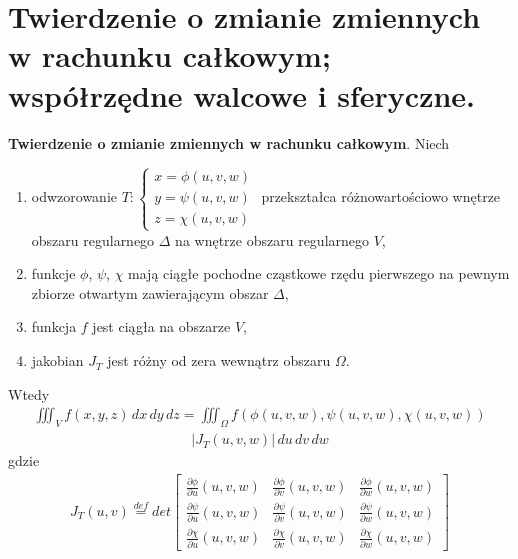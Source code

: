 \documentclass[12pt]{article}
\begin{document}
    \newpage

    \section{Twierdzenie o zmianie zmiennych w rachunku całkowym; współrzędne walcowe i sferyczne.}

    \begin{definition}
        \textbf{Twierdzenie o zmianie zmiennych w rachunku całkowym}. Niech
        \begin{enumerate}
            \item odwzorowanie $ T: \begin{cases}
                                        x = \phi(u,v,w) \\
                                        y = \psi(u,v,w) \\
                                        z = \chi(u,v,w)
            \end{cases}$ przekształca różnowartościowo wnętrze obszaru regularnego $\Delta$ na wnętrze obszaru
            regularnego $V$,
            \item funkcje $\phi$, $\psi$, $\chi$ mają ciągłe pochodne cząstkowe rzędu pierwszego na pewnym zbiorze
            otwartym zawierającym obszar $\Delta$,
            \item funkcja $f$ jest ciągła na obszarze $V$,
            \item jakobian $J_T$ jest różny od zera wewnątrz obszaru $\Omega$.
        \end{enumerate}
        Wtedy
        \begin{align*}
            \iiint_V f(x,y,z)\,dx\,dy\,dz = \iiint_{\Omega} f(\phi(u,v,w), \psi(u,v,w), \chi(u,v,w))
        \end{align*}
        \begin{align*}
            |J_T(u,v,w)| \,du\,dv\,dw
        \end{align*}
        gdzie
        \begin{align*}
            J_T (u,v) \stackrel{def}{=} det \begin{bmatrix}
                                                \frac{\partial \phi}{\partial u}(u,v,w)  & \frac{\partial \phi}{\partial v}(u,v,w) & \frac{\partial \phi}{\partial w}(u,v,w)\\
                                                \frac{\partial \psi}{\partial u}(u,v,w)  & \frac{\partial \psi}{\partial v}(u,v,w) & \frac{\partial \psi}{\partial w}(u,v,w)\\
                                                \frac{\partial \chi}{\partial u}(u,v,w)  & \frac{\partial \chi}{\partial v}(u,v,w) & \frac{\partial \chi}{\partial w}(u,v,w)
            \end{bmatrix}
        \end{align*}
    \end{definition}
\end{document}
